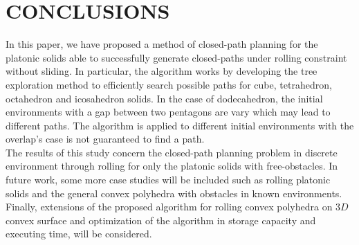 \clearpage
\newpage
\section{CONCLUSIONS}
%
\noindent In this paper, we have proposed a method of closed-path planning for the platonic solids able to successfully generate closed-paths under rolling constraint without sliding. 
%
In particular, the algorithm works by developing the tree exploration method to efficiently search possible paths for cube, tetrahedron, octahedron and icosahedron solids. 
%
In the case of dodecahedron, the initial environments with a gap between two pentagons are vary which may lead to different paths. The algorithm is applied to different initial environments with the overlap's case is not guaranteed to find a path.\\


\noindent The results of this study concern the closed-path planning problem in discrete environment through rolling for only the platonic solids with free-obstacles.
In future work, some more case studies will be included such as rolling platonic solids and the general convex polyhedra with obstacles in known environments. 
Finally, extensions of the proposed algorithm for rolling convex polyhedra on $3D$ convex surface and optimization of the algorithm in storage capacity and executing time, will be considered.\\

